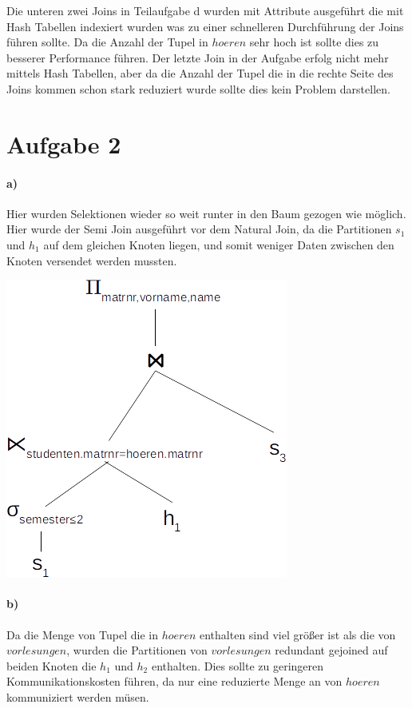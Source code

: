 \documentclass[11pt,a4paper,parskip=half ]{scrartcl}
\begin{document}
	Die unteren zwei Joins in Teilaufgabe d wurden mit Attribute ausgeführt die mit Hash Tabellen indexiert wurden was zu einer schnelleren Durchführung der Joins führen sollte. Da die Anzahl der Tupel in $hoeren$ sehr hoch ist sollte dies zu besserer Performance führen. Der letzte Join in der Aufgabe erfolg nicht mehr mittels Hash Tabellen, aber da die Anzahl der Tupel die in die rechte Seite des Joins kommen schon stark reduziert wurde sollte dies kein Problem darstellen.
	
	\newpage
	\section*{Aufgabe 2}
	\paragraph{a)} Hier wurden Selektionen wieder so weit runter in den Baum gezogen wie möglich. Hier wurde der Semi Join ausgeführt vor dem Natural Join, da die Partitionen $s_{1}$ und $h_{1}$ auf dem gleichen Knoten liegen, und somit weniger Daten zwischen den Knoten versendet werden mussten.
	
	\includegraphics[scale=.6]{2a.png}
	
	\paragraph{b)} Da die Menge von Tupel die in $hoeren$ enthalten sind viel größer ist als die von $vorlesungen$, wurden die Partitionen von $vorlesungen$ redundant gejoined auf beiden Knoten die $h_{1}$ und $h_{2}$ enthalten. Dies sollte zu geringeren Kommunikationskosten führen, da nur eine reduzierte Menge an von $hoeren$ kommuniziert werden müsen.
	
\end{document}
